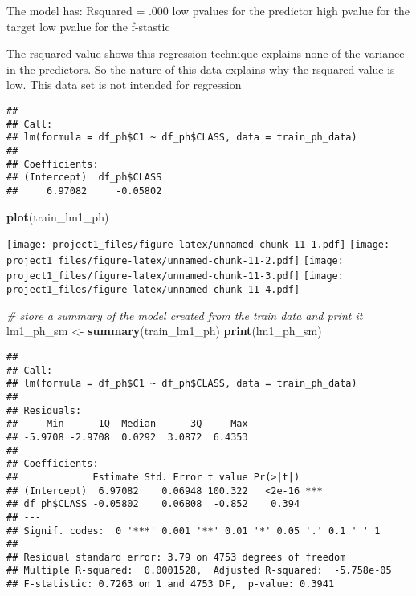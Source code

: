 \documentclass[]{article}
\newenvironment{Shaded}{\begin{snugshade}}{\end{snugshade}}
\newcommand{\KeywordTok}[1]{\textcolor[rgb]{0.13,0.29,0.53}{\textbf{#1}}}
\newcommand{\DataTypeTok}[1]{\textcolor[rgb]{0.13,0.29,0.53}{#1}}
\newcommand{\StringTok}[1]{\textcolor[rgb]{0.31,0.60,0.02}{#1}}
\newcommand{\CommentTok}[1]{\textcolor[rgb]{0.56,0.35,0.01}{\textit{#1}}}
\newcommand{\OperatorTok}[1]{\textcolor[rgb]{0.81,0.36,0.00}{\textbf{#1}}}
\newcommand{\NormalTok}[1]{#1}
\begin{document}
The model has: Rsquared = .000 low pvalues for the predictor high pvalue
for the target low pvalue for the f-stastic

The rsquared value shows this regression technique explains none of the
variance in the predictors. So the nature of this data explains why the
rsquared value is low. This data set is not intended for regression

\begin{Shaded}
\end{Shaded}

\begin{verbatim}
## 
## Call:
## lm(formula = df_ph$C1 ~ df_ph$CLASS, data = train_ph_data)
## 
## Coefficients:
## (Intercept)  df_ph$CLASS  
##     6.97082     -0.05802
\end{verbatim}

\begin{Shaded}
\begin{Highlighting}[]
\KeywordTok{plot}\NormalTok{(train_lm1_ph)}
\end{Highlighting}
\end{Shaded}

\texttt{[image: project1\_files/figure-latex/unnamed-chunk-11-1.pdf]}
\texttt{[image: project1\_files/figure-latex/unnamed-chunk-11-2.pdf]}
\texttt{[image: project1\_files/figure-latex/unnamed-chunk-11-3.pdf]}
\texttt{[image: project1\_files/figure-latex/unnamed-chunk-11-4.pdf]}

\begin{Shaded}
\begin{Highlighting}[]
\CommentTok{# store a summary of the model created from the train data and print it}
\NormalTok{lm1_ph_sm <-}\StringTok{ }\KeywordTok{summary}\NormalTok{(train_lm1_ph)}
\KeywordTok{print}\NormalTok{(lm1_ph_sm)}
\end{Highlighting}
\end{Shaded}

\begin{verbatim}
## 
## Call:
## lm(formula = df_ph$C1 ~ df_ph$CLASS, data = train_ph_data)
## 
## Residuals:
##     Min      1Q  Median      3Q     Max 
## -5.9708 -2.9708  0.0292  3.0872  6.4353 
## 
## Coefficients:
##             Estimate Std. Error t value Pr(>|t|)    
## (Intercept)  6.97082    0.06948 100.322   <2e-16 ***
## df_ph$CLASS -0.05802    0.06808  -0.852    0.394    
## ---
## Signif. codes:  0 '***' 0.001 '**' 0.01 '*' 0.05 '.' 0.1 ' ' 1
## 
## Residual standard error: 3.79 on 4753 degrees of freedom
## Multiple R-squared:  0.0001528,  Adjusted R-squared:  -5.758e-05 
## F-statistic: 0.7263 on 1 and 4753 DF,  p-value: 0.3941
\end{verbatim}
\end{document}
